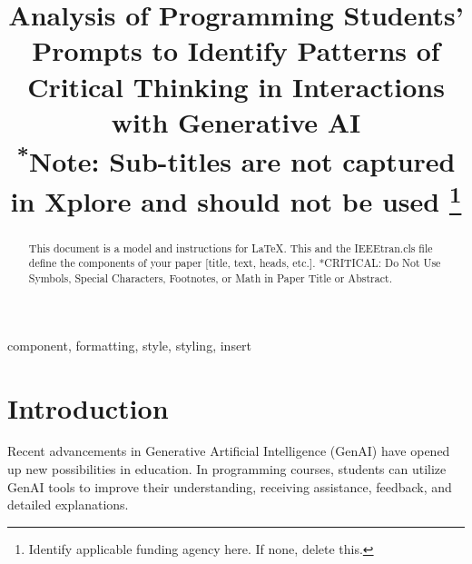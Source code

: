 \documentclass[conference]{IEEEtran}
\begin{document}
\title{Analysis of Programming Students' Prompts to Identify Patterns of
Critical Thinking in Interactions with Generative AI \\
{\footnotesize \textsuperscript{*}Note: Sub-titles are not captured in Xplore and
should not be used}
\thanks{Identify applicable funding agency here. If none, delete this.}
}

\author{
\and
{}
\and
{}
}

\maketitle

\begin{abstract}
This document is a model and instructions for \LaTeX.
This and the IEEEtran.cls file define the components of your paper [title, text, heads, etc.]. *CRITICAL: Do Not Use Symbols, Special Characters, Footnotes, 
or Math in Paper Title or Abstract.
\end{abstract}

\begin{IEEEkeywords}
component, formatting, style, styling, insert
\end{IEEEkeywords}

\section{Introduction}


Recent advancements in Generative Artificial Intelligence (GenAI) have opened
up new possibilities in education. In programming courses, students can utilize
GenAI tools to improve their understanding, receiving assistance, feedback, and
detailed explanations.
\end{document}
